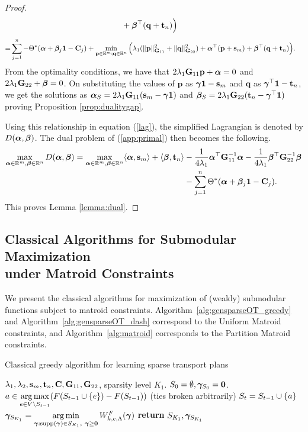 \begin{proof}
\begin{align*}
    & + \bm{\beta}^\top(\mathbf{q} + \mathbf{t}_n)\Big)
\end{align*}
\begin{align}
    =& \sum_{j=1}^n - \Theta^*(\bm{\alpha} + \bm{\beta}_j\mathbf{1} -\mathbf{C}_j) + \min\limits_{\mathbf{p}\in \mathbb{R}^m; \mathbf{q} \in \mathbb{R}^n}\Big(\lambda_1(\|\mathbf{p}\|_{\mathbf{G}_{11}}^2+\|\mathbf{q}\|_{\mathbf{G}_{22}}^2) + \bm{\alpha}^\top(\mathbf{p} + \mathbf{s}_m) + \bm{\beta}^\top(\mathbf{q} + \mathbf{t}_n)\Big).\label{lag}
\end{align}
From the optimality conditions, we have that $2\lambda_1\mathbf{G}_{11}\mathbf{p}+\bm{\alpha} = 0$ and $2\lambda_1\mathbf{G}_{22}+\bm{\beta}=0$. On substituting the values of $\mathbf{p}$ as $\bm{\gamma}\mathbf{1} -\mathbf{s}_m$ and $\mathbf{q}$ as $\bm{\gamma}^\top \mathbf{1} -\mathbf{t}_n$, we get the solutions as $\bm{\alpha}_S=2\lambda_1\mathbf{G}_{11}(\mathbf{s}_m-\bm{\gamma}\mathbf{1})$ and $\bm{\beta}_S = 2\lambda_1\mathbf{G}_{22}(\mathbf{t}_n-\bm{\gamma}^\top \mathbf{1})$ proving Proposition \ref{prop:dualitygap}. 

Using this relationship in equation (\ref{lag}), the simplified Lagrangian is denoted by $D(\bm{\alpha},\bm{\beta})$. The dual problem of (\ref{app:primal}) then becomes the following.
\begin{align*}
     \max\limits_{\bm{\alpha}\in\mathbb{R}^m,\bm{\beta}\in\mathbb{R}^n} D(\bm{\alpha},\bm{\beta})
     =\max\limits_{\bm{\alpha}\in\mathbb{R}^m,\bm{\beta}\in\mathbb{R}^n} \langle\bm{\alpha},\mathbf{s}_m\rangle + \langle\bm{\beta},\mathbf{t}_n\rangle &- \frac{1}{4\lambda_1}\bm{\alpha}^\top \mathbf{G}_{11}^{-1}\bm{\alpha}
         -\frac{1}{4\lambda_1} \bm{\beta}^\top \mathbf{G}_{22}^{-1}\bm{\beta}\\
         & -\sum_{j=1}^n \Theta^*(\bm{\alpha}+\bm{\beta}_j\mathbf{1} - \mathbf{C}_j).
\end{align*}
This proves Lemma \ref{lemma:dual}.
\end{proof}

\subsection{Classical Algorithms for Submodular Maximization\\ under Matroid Constraints}
We present the classical algorithms for maximization of (weakly) submodular functions subject to matroid constraints. Algorithm~\ref{alg:gensparseOT_greedy} and Algorithm~\ref{alg:gensparseOT_dash} correspond to the Uniform Matroid constraints, and Algorithm~\ref{alg:matroid} corresponds to the Partition Matroid constraints.
\begin{algorithm}[ht!]
\caption{Classical greedy algorithm for learning sparse transport plans}\label{alg:gensparseOT_greedy}
\begin{algorithmic}[1]
\Require $\lambda_1, \lambda_2, \mathbf{s}_m, \mathbf{t}_n, \mathbf{C}, \mathbf{G}_{11}, \mathbf{G}_{22}$, sparsity level $K_1$.
\State $S_0=\emptyset, \bm{\gamma}_{S_0}=\mathbf{0}$.
\State  $a \in \mathop{\rm arg\,max}\limits_{e\in V\setminus S_{t-1}}(F(S_{t-1}\cup \{e\})-F(S_{t-1}))$ (ties broken arbitrarily)
\State $S_t = S_{t-1}\cup \{a\}$
\EndFor
\State $\bm{\gamma}_{S_{K_1}} = \mathop{\rm arg\,min}\limits_{\bm{\gamma}:\textup{supp}(\bm{\gamma})\in S_{K_1},~ \bm{\gamma}\ge \mathbf{0}}{W^F_{k, c, \Lambda}(\bm{\gamma})}$
\State \textbf{return} $S_{K_1}, \bm{\gamma}_{S_{K_1}}$
\end{algorithmic}
\end{algorithm}

